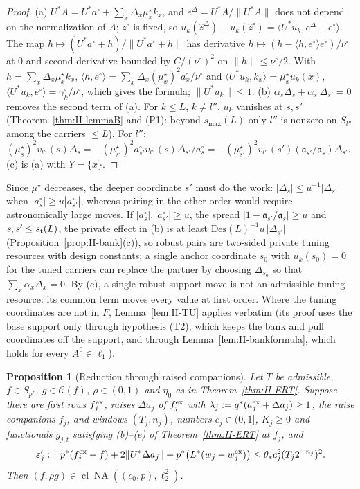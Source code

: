 \documentclass[10pt]{amsart}
\newtheorem{proposition}[theorem]{Proposition}
\theoremstyle{definition}
\theoremstyle{remark}
\newcommand{\NA}{\operatorname{NA}}
\newcommand{\Cset}{\mathcal C}
\newcommand{\cl}{\operatorname{cl}}
\newcommand{\zh}{\hat z}
\newcommand{\ip}[2]{\langle #1,#2\rangle}
\begin{document}
\begin{proof}
(a) $U^*A=U^*a^\circ+\sum_x\Delta_x\mu^\star_xk_x$, and $e^\Delta=U^*A/\|U^*A\|$
does not depend on the normalization of $A$; $z^\circ$ is fixed, so
$u_k(\zh^\Delta)-u_k(\zh^\circ)=\ip{U^*u_k}{e^\Delta-e^\circ}$.  The map
$h\mapsto(U^*a^\circ+h)/\|U^*a^\circ+h\|$ has derivative $h\mapsto(h-
\ip h{e^\circ}e^\circ)/\nu^\circ$ at $0$ and second derivative bounded by
$C/(\nu^\circ)^2$ on $\|h\|\le\nu^\circ/2$.  With $h=\sum_x\Delta_x\mu^\star_xk_x$,
$\ip h{e^\circ}=\sum_x\Delta_x(\mu^\star_x)^2a^\circ_x/\nu^\circ$ and
$\ip{U^*u_k}{k_x}=\mu^\star_xu_k(x)$, $\ip{U^*u_k}{e^\circ}=\gamma^\circ_k/
\nu^\circ$, which gives the formula; $\|U^*u_k\|\le1$.
(b) $\alpha_s\Delta_s+\alpha_{s'}\Delta_{s'}=0$ removes the second term of (a).
For $k\le L$, $k\ne l''$, $u_k$ vanishes at $s,s'$ (Theorem~\ref{thm:II-lemmaB}
and (P1): beyond $s_{\max}(L)$ only $l''$ is nonzero on $S_{l''}$ among the
carriers $\le L$).  For $l''$: $(\mu^\star_s)^2v_{l''}(s)\Delta_s=
-(\mu^\star_{s'})^2a^\circ_{s'}v_{l''}(s)\Delta_{s'}/a^\circ_s=-(\mu^\star_{s'})^2
v_{l''}(s')(\mathfrak a_{s'}/\mathfrak a_s)\Delta_{s'}$.  (c) is (a) with $Y=\{x\}$.
\end{proof}

Since $\mu^\star$ decreases, the deeper coordinate $s'$ must do the work:
$|\Delta_s|\le u^{-1}|\Delta_{s'}|$ when $|a^\circ_s|\ge u|a^\circ_{s'}|$, whereas
pairing in the other order would require astronomically large moves.  If
$|a^\circ_s|,|a^\circ_{s'}|\ge u$, the spread $|1-\mathfrak a_{s'}/\mathfrak a_s|\ge u$ and
$s,s'\le s_{\rm t}(L)$, the private effect in (b) is at least
$\mathrm{Des}(L)^{-1}u\,|\Delta_{s'}|$ (Proposition~\ref{prop:II-bank}(c)), so robust
pairs are two-sided private tuning resources with design constants; a single
anchor coordinate $s_0$ with $u_k(s_0)=0$ for the tuned carriers can replace
the partner by choosing $\Delta_{s_0}$ so that $\sum_x\alpha_x\Delta_x=0$.  By (c),
a single robust support move is not an admissible tuning resource: its common
term moves every value at first order.  Where the tuning coordinates are not
in $F$, Lemma~\ref{lem:II-TU} applies verbatim (its proof uses the base support
only through hypothesis (T2), which keeps the bank and pull coordinates off
the support, and through Lemma~\ref{lem:II-bankformula}, which holds for every
$A^0\in\ell_1$).

\begin{proposition}[Reduction through raised companions]\label{prop:II-Minfred}
Let $T$ be admissible, $f\in S_{p^*}$, $g\in\Cset(f)$, $\rho\in(0,1)$ and
$\eta_0$ as in Theorem~\textup{\ref{thm:II-ERT}}.  Suppose there are first rows
$f^{\rm ex}_j$, raises $\Delta a_j$ of $f^{\rm ex}_j$ with $\lambda_j:=
q^*(a^{\rm ex}_j+\Delta a_j)\ge1$, the raise companions $f_j$, and windows
$(T_j,n_j)$, numbers $c_j\in(0,1]$, $K_j\ge0$ and functionals $g_{j,t}$
satisfying \textup{(b)}--\textup{(e)} of Theorem~\textup{\ref{thm:II-ERT}} at
$f_j$, and
\[
 \varepsilon'_j:=p^*(f^{\rm ex}_j-f)+2\|U^*\Delta a_j\|+p^*\big(L^*(w_j-
 w^{\rm ex}_j)\big)\le\theta_*c_j^2(T_j2^{-n_j})^2 .
\]
Then $(f,\rho g)\in\cl\NA((c_0,p),\ell_2^2)$.
\end{proposition}
\end{document}
